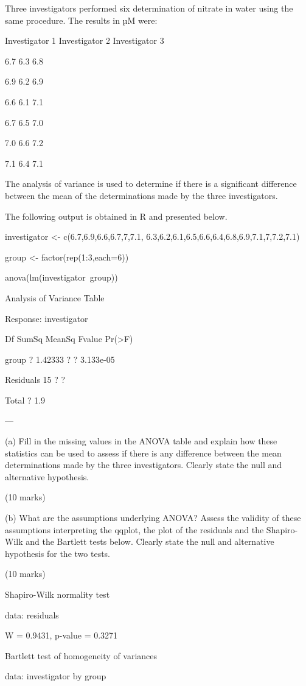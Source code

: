 
Three investigators performed six determination of nitrate in water using the same procedure. The results in µM were:

Investigator 1 Investigator 2 Investigator 3

6.7 6.3 6.8

6.9 6.2 6.9

6.6 6.1 7.1

6.7 6.5 7.0

7.0 6.6 7.2

7.1 6.4 7.1

The analysis of variance is used to determine if there is a significant difference between the mean of the determinations made by the three investigators.

The following output is obtained in R and presented below.

investigator <- c(6.7,6.9,6.6,6.7,7,7.1, 6.3,6.2,6.1,6.5,6.6,6.4,6.8,6.9,7.1,7,7.2,7.1)

group <- factor(rep(1:3,each=6))

anova(lm(investigator~group))

Analysis of Variance Table

Response: investigator

Df SumSq MeanSq Fvalue Pr(>F)

group ? 1.42333 ? ? 3.133e-05

Residuals 15 ? ?

Total ? 1.9

---

(a) Fill in the missing values in the ANOVA table and explain how these statistics can be used to assess if there is any difference between the mean determinations made by the three investigators. Clearly state the null and alternative hypothesis.

(10 marks)

(b) What are the assumptions underlying ANOVA? Assess the validity of these assumptions interpreting the qqplot, the plot of the residuals and the Shapiro-Wilk and the Bartlett tests below. Clearly state the null and alternative hypothesis for the two tests.

(10 marks)

Shapiro-Wilk normality test

data: residuals

W = 0.9431, p-value = 0.3271

Bartlett test of homogeneity of variances

data: investigator by group

